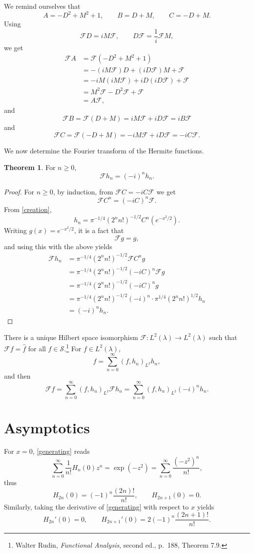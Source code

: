\documentclass{article}
\theoremstyle{definition}
\newtheorem{theorem}{Theorem}
\theoremstyle{definition}
\begin{document}
We remind ourselves that 
\[
A=-D^2+M^2+1, \qquad B=D+M,\qquad C=-D+M.
\]
Using 
\[
\mathscr{F}D = iM\mathscr{F},\qquad D\mathscr{F}=\frac{1}{i}\mathscr{F}M,
\]
we get
\begin{align*}
\mathscr{F}A&=\mathscr{F}(-D^2+M^2+1)\\
&=-(iM\mathscr{F})D+(iD\mathscr{F})M+\mathscr{F}\\
&=-iM(iM\mathscr{F})+iD(iD\mathscr{F})+\mathscr{F}\\
&=M^2\mathscr{F}-D^2\mathscr{F}+\mathscr{F}\\
&=A\mathscr{F},
\end{align*}
and
\[
\mathscr{F}B=\mathscr{F}(D+M)=iM\mathscr{F}+iD\mathscr{F}=iB\mathscr{F}
\]
and
\[
\mathscr{F}C=\mathscr{F}(-D+M)=-iM\mathscr{F}+iD\mathscr{F}=
-iC\mathscr{F}.
\]

We now determine the Fourier transform of the Hermite functions.

\begin{theorem}
For $n \geq 0$,
\[
\mathscr{F}h_n= (-i)^n h_n.
\]
\end{theorem}
\begin{proof}
For $n \geq 0$, by induction,  from $\mathscr{F}C = -iC\mathscr{F}$ we get
\[
\mathscr{F}C^n = (-iC)^n \mathscr{F}.
\]
From \eqref{creation},
\[
h_n=\pi^{-1/4}(2^n n!)^{-1/2} C^n(e^{-x^2/2}).
\]
Writing $g(x)=e^{-x^2/2}$, it is a fact that
\[
\mathscr{F}g = g,
\]
and using this with the above yields
\begin{align*}
\mathscr{F}h_n&=\pi^{-1/4}(2^n n!)^{-1/2} \mathscr{F} C^n g\\
&=\pi^{-1/4}(2^n n!)^{-1/2} (-iC)^n  \mathscr{F}g\\
&=\pi^{-1/4}(2^n n!)^{-1/2} (-iC)^ng\\
&=\pi^{-1/4}(2^n n!)^{-1/2} (-i)^n \cdot \pi^{1/4} (2^n n!)^{1/2} h_n\\
&=(-i)^n h_n.
\end{align*}
\end{proof}



There is a unique Hilbert space isomorphism $\mathscr{F}:L^2(\lambda) \to L^2(\lambda)$
such that $\mathscr{F}f=\hat{f}$ for all $f \in \mathscr{S}$.\footnote{Walter Rudin, {\em Functional Analysis}, second ed.,
p.~188, Theorem 7.9.}
For $f \in L^2(\lambda)$, 
\[
f = \sum_{n=0}^\infty (f,h_n)_{L^2} h_n,
\]
and then
\[
\mathscr{F} f = \sum_{n=0}^\infty (f,h_n)_{L^2} \mathscr{F}h_n
= \sum_{n=0}^\infty (f,h_n)_{L^2} (-i)^n h_n.
\]


\section{Asymptotics}
For $x=0$, \eqref{generating} reads
\[
\sum_{n=0}^\infty \frac{1}{n!} H_n(0)z^n = \exp(-z^2) = \sum_{n=0}^\infty \frac{(-z^2)^n}{n!},
\]
thus
\[
H_{2n}(0) = (-1)^n \frac{(2n)!}{n!},\qquad H_{2n+1}(0)=0.
\]
Similarly, taking the derivative of \eqref{generating} with respect to $x$ yields
\[
H_{2n}'(0)=0,\qquad H_{2n+1}'(0) = 2(-1)^n \frac{(2n+1)!}{n!}.
\]
\end{document}

